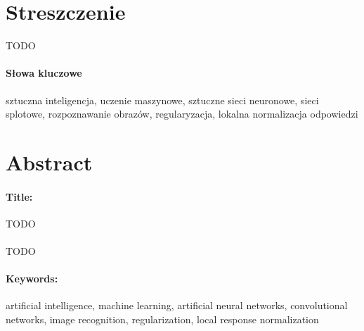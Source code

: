\newpage
\thispagestyle{empty} %
\section*{Streszczenie}
TODO
\paragraph{Słowa kluczowe} sztuczna inteligencja, uczenie maszynowe, sztuczne sieci neuronowe, sieci splotowe,
rozpoznawanie obrazów, regularyzacja, lokalna normalizacja odpowiedzi

\section*{Abstract}
\paragraph{Title:} TODO\\\\
TODO
\paragraph{Keywords:} artificial intelligence, machine learning, artificial neural networks, convolutional networks,
image recognition, regularization, local response normalization